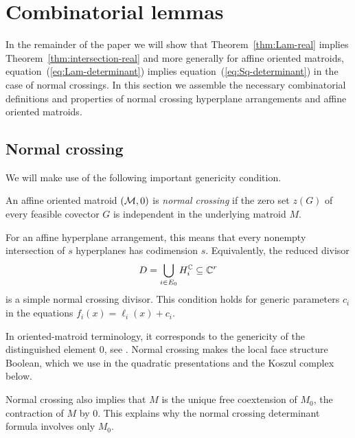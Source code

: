 \section{Combinatorial lemmas}\label{sec:comb}

In the remainder of the paper we will show that Theorem~\ref{thm:Lam-real} implies Theorem~\ref{thm:intersection-real} and more generally for affine oriented matroids, equation~(\ref{eq:Lam-determinant}) implies equation~(\ref{eq:Sq-determinant}) in the case of normal crossings.  In this section we assemble the necessary combinatorial definitions and properties of normal crossing hyperplane arrangements and affine oriented matroids.

\subsection{Normal crossing} We will make use of the following important genericity condition.
\begin{definition}\label{def:normal-crossing}
An affine oriented matroid $(\mathcal M,0)$ is \emph{normal crossing} if the
zero set $z(G)$ of every feasible covector $G$ is independent in the
underlying matroid $M$.
\end{definition}
For an affine hyperplane arrangement, this means that every nonempty
intersection of $s$ hyperplanes has codimension $s$. Equivalently, the
reduced divisor
\[
 D=\bigcup_{i\in E_0}H_i^{\mathbb C}\subseteq\mathbb C^r
\]
is a simple normal crossing divisor.
This condition holds for generic parameters $c_i$ in the equations $f_i(x)=\ell_i(x)+c_i$.

In oriented-matroid terminology, it corresponds to the genericity of the distinguished
element $0$, see \cite[Remark 2.3 and Section 5.2]{KowalenkoMautner}.
Normal crossing makes the local face structure Boolean, which we use
in the quadratic presentations and the Koszul complex below.

Normal crossing also implies that $M$ is the unique free coextension of $M_0$, the contraction of $M$ by $0$. This explains why
the normal crossing determinant formula involves only $M_0$.

